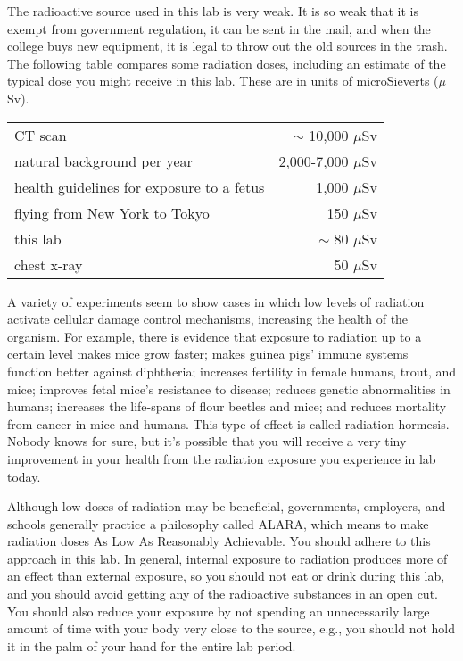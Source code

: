 \newcommand{\mus}{$\mu$Sv}

The radioactive source used in this lab is very
weak. It is so weak that it is exempt from government
regulation, it can be sent in the mail, and when the college buys new equipment, it is
legal to throw out the old sources in the trash.
The following table compares some radiation doses, including an estimate of the typical dose
you might receive in this lab. These are in units of microSieverts (\mus).


\begin{tabular}{p{50mm}r}
  CT scan                                    & $\sim$ 10,000 \mus \\
  natural background per year                & 2,000-7,000 \mus \\
  health guidelines for exposure to a fetus  & 1,000 \mus \\
  flying from New York to Tokyo              & 150 \mus \\
  this lab                                   & $\sim$ 80 \mus \\
  chest x-ray                                & 50 \mus
\end{tabular}

A variety of experiments seem to show cases in which
low levels of radiation activate cellular damage control mechanisms, increasing
the health of the organism. For example, there is evidence that exposure to radiation up to a certain level makes mice grow
faster; makes guinea pigs' immune systems function better against diphtheria; increases fertility in female humans, trout, and mice;
improves fetal mice's resistance to disease; reduces genetic abnormalities in humans;
increases the life-spans of flour beetles and mice; and reduces mortality from cancer in mice and humans.
This type of effect is called radiation
hormesis. Nobody knows for sure, but it's possible that you will receive a very tiny improvement in your health from the radiation exposure
you experience in lab today.

Although low doses of radiation may be beneficial, 
governments, employers, and schools generally practice a philosophy called
ALARA, which means to make radiation doses As Low As Reasonably Achievable.
You should adhere to this approach in this lab.
In general, internal exposure to radiation produces more of an effect than external
exposure, so you should not eat or drink during this lab, and
you should avoid getting any of the radioactive substances in an
open cut. You should also reduce your exposure by not spending an unnecessarily large amount of time
with your body very close to the source, e.g., you should not hold it in the palm of your hand
for the entire lab period.

